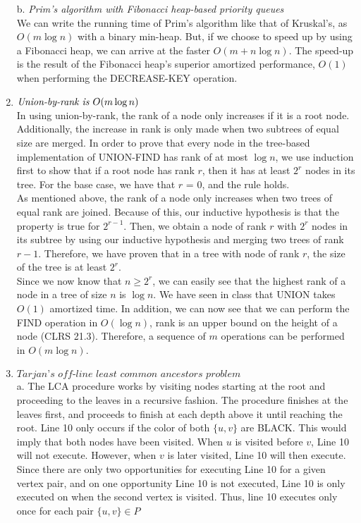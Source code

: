\documentclass[]{report}
\begin{document}
\begin{enumerate}
	
	 b. \textit{Prim's algorithm with Fibonacci heap-based priority queues} \\
	 
	 We can write the running time of Prim's algorithm like that of Kruskal's, as $ O(m\log n) $ with a binary min-heap. But, if we choose to speed up by using a Fibonacci heap, we can arrive at the faster $ O(m + n \log n) $. The speed-up is the result of the Fibonacci heap's superior amortized performance, $ O(1) $ when performing the DECREASE-KEY operation.\\ 	 
	 
	 \item  $ \textit{Union-by-rank is $ O(m \log n) $}  $ \\
	 
	 In using union-by-rank, the rank of a node only increases if it is a root node. Additionally, the increase in rank is only made when two subtrees of equal size are merged. In order to prove that every node in the tree-based implementation of UNION-FIND has rank of at most $ \log n $, we use induction first to show that if a root node has rank $ r $, then it has at least $ 2^{r} $ nodes in its tree. For the base case, we have that $ r $ = 0, and the rule holds. \\
	 
	 As mentioned above,  the rank of a node only increases when two trees of equal rank are joined. Because of this, our inductive hypothesis is that the property is true for $ 2^{r-1} $. Then, we obtain a node of rank $ r $ with $ 2^{r} $ nodes in its subtree by using our inductive hypothesis and merging two trees of rank $ r-1 $. Therefore, we have proven that in a tree with node of rank $ r $, the size of the tree is at least $ 2^{r} $. \\
	 
	 Since we now know that $ n \geq 2^{r} $, we can easily see that the highest rank of a node in a tree of size $ n $ is $ \log n $. We have seen in class that UNION takes $ O(1) $ amortized time. In addition, we can now see that we can perform the FIND operation in $ O(\log n) $, rank is an upper bound on the height of a node (CLRS 21.3). Therefore,  a sequence of $ m $ operations can be performed in $ O( m \log n) $.

	 \item  $ \textit{Tarjan's off-line least common ancestors problem} $ \\
	 
	 a. The LCA procedure works by visiting nodes starting at the root and proceeding to the leaves in a recursive fashion. The procedure finishes at the leaves first, and proceeds to finish at each depth above it until reaching the root. Line 10 only occurs if the color of both $ \{u,v\} $ are BLACK. This would imply that both nodes have been visited. When $ u $ is visited before $ v $, Line 10 will not execute. However, when $ v $ is later visited, Line 10 will then execute. Since there are only two opportunities for executing Line 10 for a given vertex pair, and on one opportunity Line 10 is not executed, Line 10 is only executed on when the second vertex is visited. Thus, line 10 executes only once for each pair $\{u,v\} \in P $ \\
	 

\end{enumerate}
\end{document}
